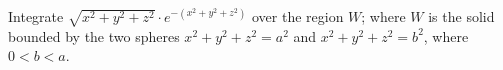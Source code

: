 Integrate \( \sqrt{x^2 + y^2 + z^2} \cdot e^{-(x^2 + y^2 + z^2)} \) over the region \( W \); where \( W \) is the solid bounded by the two spheres \( x^2 + y^2 + z^2 = a^2 \) and \( x^2 + y^2 + z^2 = b^2 \), where \( 0 < b < a \).
